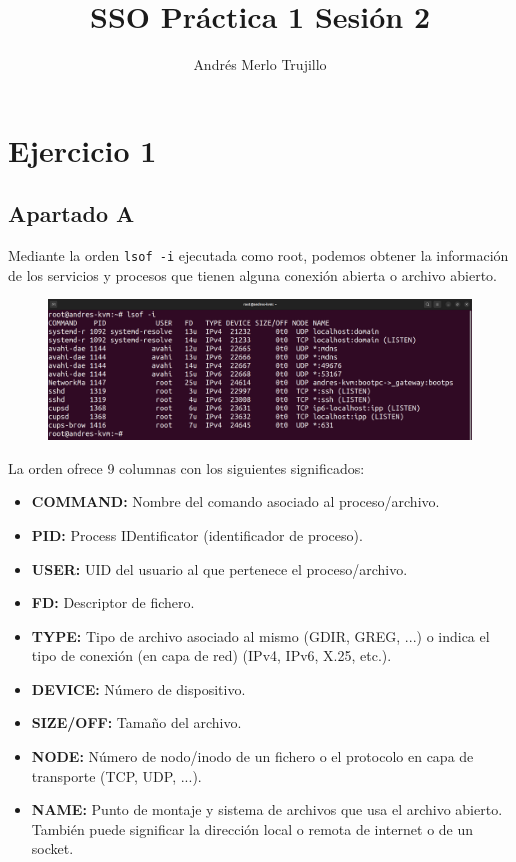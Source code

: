 \documentclass{article}
\title{SSO Práctica 1 Sesión 2}
\author{Andrés Merlo Trujillo}
\date{}
\begin{document}
\maketitle

\tableofcontents

\newpage
{}
\section*{Ejercicio 1}

\subsection*{Apartado A}
Mediante la orden \verb|lsof -i| ejecutada como root, podemos obtener la información de los servicios y procesos que tienen alguna conexión abierta o archivo abierto.

\begin{figure}[H]
    \includegraphics[width=\textwidth]{imagenes/lsofi.png}
\end{figure}

La orden ofrece 9 columnas con los siguientes significados:

\begin{itemize}
    \item \textbf{COMMAND: }Nombre del comando asociado al proceso/archivo.
    \item \textbf{PID: }Process IDentificator (identificador de proceso).
    \item \textbf{USER: }UID del usuario al que pertenece el proceso/archivo.
    \item \textbf{FD: }Descriptor de fichero.
    \item \textbf{TYPE: }Tipo de archivo asociado al mismo (GDIR, GREG, ...) o indica el tipo de conexión (en capa de red) (IPv4, IPv6, X.25, etc.).
    \item \textbf{DEVICE: }Número de dispositivo.
    \item \textbf{SIZE/OFF: }Tamaño del archivo.
    \item \textbf{NODE: }Número de nodo/inodo de un fichero o el protocolo en capa de transporte (TCP, UDP, ...).
    \item \textbf{NAME: }Punto de montaje y sistema de archivos que usa el archivo abierto. También puede significar la dirección local o remota de internet o de un socket.
\end{itemize}
\end{document}
